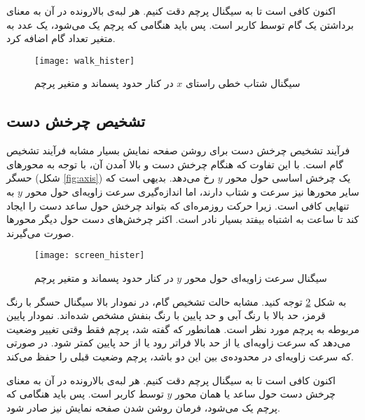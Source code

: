 اکنون کافی است تا به سیگنال پرچم دقت کنیم. هر لبه‌ی بالارونده در آن  به معنای برداشتن یک گام توسط کاربر است. پس باید هنگامی که پرچم یک می‌شود، یک عدد به متغیر تعداد گام اضافه کرد.

\newpage
\begin{figure}[h]
	\centering
	\texttt{[image: walk\_hister]}
	\caption{سیگنال شتاب خطی راستای $x$ در کنار حدود پسماند و متغیر پرچم}
	\label{fig:walk-hister}
\end{figure}

\subsection{تشخیص چرخش دست}
فرآیند تشخیص چرخش دست برای روشن صفحه نمایش بسیار مشابه فرآیند تشخیص گام است. با این تفاوت که هنگام چرخش دست و بالا آمدن آن، با توجه به محورهای حسگر (شکل \ref{fig:axis}) یک چرخش اساسی حول محور $y$ رخ می‌دهد. بدیهی است که سایر محورها نیز سرعت و شتاب دارند، اما اندازه‌گیری سرعت زاویه‌ای حول محور $y$ به تنهایی کافی است. زیرا حرکت روزمره‌ای که بتواند چرخش حول ساعد دست را ایجاد کند تا ساعت به اشتباه بیفتد بسیار نادر است. اکثر چرخش‌های دست حول دیگر محورها صورت می‌گیرند.

\begin{figure}[h]
	\centering
	\texttt{[image: screen\_hister]}
	\caption{سیگنال سرعت زاویه‌ای حول محور $y$ در کنار حدود پسماند و متغیر پرچم}
	\label{fig:screen-hister}
\end{figure}

به شکل \ref{fig:screen-hister} توجه کنید. مشابه حالت تشخیص گام، در نمودار بالا سیگنال حسگر با رنگ قرمز، حد بالا با رنگ آبی و حد پایین با رنگ بنفش مشخص شده‌اند. نمودار پایین مربوطه به پرچم مورد نظر است. همانطور که گفته شد، پرچم فقط وقتی تغییر وضعیت می‌دهد که سرعت زاویه‌ای یا از حد بالا فراتر رود یا از حد پایین کمتر شود. در صورتی که سرعت زاویه‌ای در محدوده‌ی بین این دو باشد، پرچم وضعیت قبلی را حفظ می‌کند.

اکنون کافی است تا به سیگنال پرچم دقت کنیم. هر لبه‌ی بالارونده در آن  به معنای چرخش دست حول ساعد یا همان محور $y$ توسط کاربر است. پس باید هنگامی که پرچم یک می‌شود، فرمان روشن شدن صفحه نمایش نیز صادر شود.

